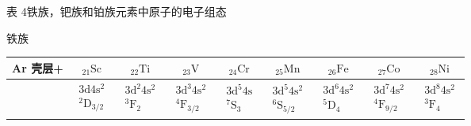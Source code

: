 \begin{center}
{\heiti 表 4}\quad 铁族，钯族和铂族元素中原子的电子组态

\vspace{0.6em}
铁\quad 族\\[0.5em]
\small\setlength{\tabcolsep}{2.5pt}%
\begin{tabular}{|c||c|c|c|c|c|c|c|c|}
\hline
Ar 壳层+ & ${}_{21}\mathrm{Sc}$ & ${}_{22}\mathrm{Ti}$ & ${}_{23}\mathrm{V}$ & ${}_{24}\mathrm{Cr}$ & ${}_{25}\mathrm{Mn}$ & ${}_{26}\mathrm{Fe}$ & ${}_{27}\mathrm{Co}$ & ${}_{28}\mathrm{Ni}$\\
\hline
 & $\begin{array}{c}3\mathrm{d}4\mathrm{s}^{2}\\{}^{2}\mathrm{D}_{3/2}\end{array}$ &
$\begin{array}{c}3\mathrm{d}^{2}4\mathrm{s}^{2}\\{}^{3}\mathrm{F}_{2}\end{array}$ &
$\begin{array}{c}3\mathrm{d}^{3}4\mathrm{s}^{2}\\{}^{4}\mathrm{F}_{3/2}\end{array}$ &
$\begin{array}{c}3\mathrm{d}^{5}4\mathrm{s}\\{}^{7}\mathrm{S}_{3}\end{array}$ &
$\begin{array}{c}3\mathrm{d}^{5}4\mathrm{s}^{2}\\{}^{6}\mathrm{S}_{5/2}\end{array}$ &
$\begin{array}{c}3\mathrm{d}^{6}4\mathrm{s}^{2}\\{}^{5}\mathrm{D}_{4}\end{array}$ &
$\begin{array}{c}3\mathrm{d}^{7}4\mathrm{s}^{2}\\{}^{4}\mathrm{F}_{9/2}\end{array}$ &
$\begin{array}{c}3\mathrm{d}^{8}4\mathrm{s}^{2}\\{}^{3}\mathrm{F}_{4}\end{array}$\\
\hline
\end{tabular}


\end{center}
